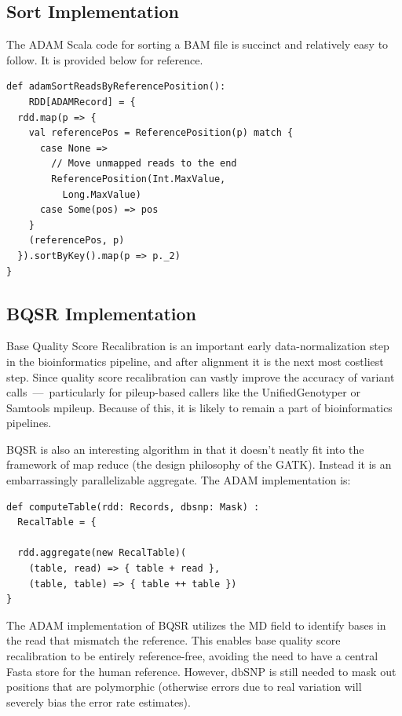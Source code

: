 \documentclass[10pt,twocolumn]{article}
\theoremstyle{plain}
\begin{document}
\subsection{Sort Implementation}
\label{sec:sort-implementation}

The ADAM Scala code for sorting a BAM file is succinct and relatively 
easy to follow. It is provided below for reference.

\begin{lstlisting}
def adamSortReadsByReferencePosition():
    RDD[ADAMRecord] = {
  rdd.map(p => {
    val referencePos = ReferencePosition(p) match {
      case None =>
        // Move unmapped reads to the end
        ReferencePosition(Int.MaxValue,
          Long.MaxValue)
      case Some(pos) => pos
    }
    (referencePos, p)
  }).sortByKey().map(p => p._2)
}
\end{lstlisting}

\subsection{BQSR Implementation}
\label{sec:bqsr-implementation}

Base Quality Score Recalibration is an important early data-normalization step in the bioinformatics pipeline, and after alignment
it is the next most costliest step. Since quality score recalibration can vastly improve the accuracy of variant calls~---~particularly for
pileup-based callers like the UnifiedGenotyper or Samtools mpileup. Because of this, it is likely to remain a part of bioinformatics pipelines.

BQSR is also an interesting algorithm in that it doesn't neatly fit into the framework of map reduce (the design philosophy of the GATK).
Instead it is an embarrassingly parallelizable aggregate. The ADAM implementation is:

\begin{lstlisting}
def computeTable(rdd: Records, dbsnp: Mask) :
  RecalTable = {
  
  rdd.aggregate(new RecalTable)(
    (table, read) => { table + read },
    (table, table) => { table ++ table })
}
\end{lstlisting}

The ADAM implementation of BQSR utilizes the MD field to identify bases in the read that mismatch the reference. This enables
base quality score recalibration to be entirely reference-free, avoiding the need to have a central Fasta store for the human
reference. However, dbSNP is still needed to mask out positions that are polymorphic (otherwise errors due to real variation will
severely bias the error rate estimates).
\end{document}
